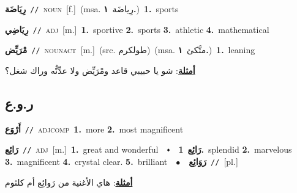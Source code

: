 \documentclass[10pt,a4paper,twoside]{article} %
\begin{document}
\begin{multicols}{2}
{\setlength\topsep{0pt}\textbf{\foreignlanguage{arabic}{رِيَاضَة}}\ {\color{gray}\texttt{//}\color{black}}\ \textsc{noun}\ [f.]\ \color{gray}(msa. \foreignlanguage{arabic}{رِياضَة}~\foreignlanguage{arabic}{\textbf{١.}})\color{black}\ \textbf{1.}~sports\ } \vspace{2mm}

{\setlength\topsep{0pt}\textbf{\foreignlanguage{arabic}{رِيَاضِي}}\ {\color{gray}\texttt{//}\color{black}}\ \textsc{adj}\ [m.]\ \textbf{1.}~sportive  \textbf{2.}~sports  \textbf{3.}~athletic  \textbf{4.}~mathematical\ } \vspace{2mm}

{\setlength\topsep{0pt}\textbf{\foreignlanguage{arabic}{مْرَيِّض}}\ {\color{gray}\texttt{//}\color{black}}\ \textsc{noun\textunderscore act}\ [m.]\ (src. \color{gray}\foreignlanguage{arabic}{طولكرم}\color{black})\ \color{gray}(msa. \foreignlanguage{arabic}{متَّكئ}~\foreignlanguage{arabic}{\textbf{١.}})\color{black}\ \textbf{1.}~leaning\  \begin{flushright}\color{gray}\foreignlanguage{arabic}{\textbf{\underline{\foreignlanguage{arabic}{أمثلة}}}: شو يا حبيبي قاعد ومْرَيِّض ولا عدِّنُّه وراك شغل؟}\end{flushright}\color{black}} \vspace{2mm}

\vspace{-3mm}
\subsection*{\color{blue}\foreignlanguage{arabic}{ر.و.ع}\color{blue}{}} 

{\setlength\topsep{0pt}\textbf{\foreignlanguage{arabic}{أَرْوَع}}\ {\color{gray}\texttt{//}\color{black}}\ \textsc{adj\textunderscore comp}\ \textbf{1.}~more  \textbf{2.}~most magnificent\ } \vspace{2mm}

{\setlength\topsep{0pt}\textbf{\foreignlanguage{arabic}{رَائِع}}\ {\color{gray}\texttt{//}\color{black}}\ \textsc{adj}\ [m.]\ \textbf{1.}~great and wonderful\ \ $\smblkdiamond$\ \ \setlength\topsep{0pt}\textbf{\foreignlanguage{arabic}{رَائِع}}\ \textbf{1.}~splendid  \textbf{2.}~marvelous  \textbf{3.}~magnificent  \textbf{4.}~crystal clear.  \textbf{5.}~brilliant\ \ $\bullet$\ \ \setlength\topsep{0pt}\textbf{\foreignlanguage{arabic}{رَوَائِع}}\ {\color{gray}\texttt{//}\color{black}}\ [pl.]\  \begin{flushright}\color{gray}\foreignlanguage{arabic}{\textbf{\underline{\foreignlanguage{arabic}{أمثلة}}}: هاي الأغنية من رَوائِع أم كلثوم}\end{flushright}\color{black}} \vspace{2mm}


\end{multicols}
\end{document}
